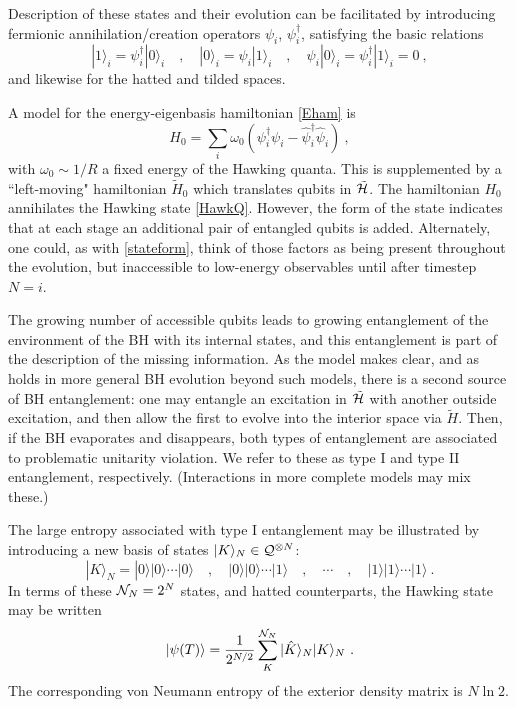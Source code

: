 \documentclass[12pt]{article}
\numberwithin{equation}{section}
\newcommand{\calh}{{\cal H}}
\newcommand{\caln}{{\cal N}}
\newcommand{\calq}{{\cal Q}}
\newcommand{\beq}{\begin{equation}}
\newcommand{\eeq}{\end{equation}}
\begin{document}
Description of these states  and their evolution can be facilitated by introducing fermionic annihilation/creation operators $\psi_i$, $\psi_i^\dagger$, satisfying the basic relations
\beq
|1\rangle_i = \psi_i^\dagger |0\rangle_i\quad ,\quad |0\rangle_i = \psi_i |1\rangle_i\quad,\quad \psi_i |0\rangle_i= \psi_i^\dagger |1\rangle_i =0\ ,
\eeq
and likewise for the hatted and tilded spaces.  

A model for the energy-eigenbasis hamiltonian \eqref{Eham} is 
\beq\label{Hzero}
H_0=\sum_i \omega_0 \left(\psi_i^\dagger \psi_i - \hat \psi_i^\dagger \hat \psi_i\right)\ ,
\eeq
with $\omega_0\sim 1/R$ a fixed energy of the Hawking quanta.  This is supplemented by a ``left-moving" hamiltonian $\tilde H_0$ which translates qubits in $\tilde \calh$.  The hamiltonian $H_0$ annihilates the Hawking state \eqref{HawkQ}.  However, the form of the state indicates that at each stage an additional pair of entangled qubits is added.  Alternately, one could, as with \eqref{stateform}, think of those factors as being present throughout the evolution, but inaccessible to low-energy observables until after timestep $N=i$.  

The growing number of accessible qubits leads to growing entanglement of the environment of the BH with its internal states, and this entanglement is part of the description of the missing information.  As the model makes clear, and as holds in more general BH evolution beyond such models, there is a second source of BH entanglement: one may entangle an excitation in $\tilde \calh$ with another outside excitation, and then allow the first to evolve into the interior space via $\tilde H$.  Then, if the BH evaporates and disappears, both types of entanglement are associated to problematic unitarity violation.  We refer to these as type I and type II entanglement, respectively.  (Interactions in more complete models may mix these.)

The large entropy associated with type I entanglement may be illustrated by introducing a new basis of states $|K\rangle_N\in \calq^{\otimes N}$:
\beq
|K\rangle_N =  |0\rangle |0\rangle\cdots  |0\rangle\quad,\quad |0\rangle |0\rangle\cdots  |1\rangle\quad ,\quad\cdots\quad,  \quad |1\rangle |1\rangle\cdots   |1\rangle\ .
\eeq
In terms of these $\caln_N=2^N$ states, and hatted counterparts, the Hawking state may be written 
\beq\label{Hawkexp}
|\psi(T)\rangle = \frac{1}{2^{N/2}}  \sum_{K}^{\caln_N}|\hat K\rangle_N  |K\rangle_N \ .
\eeq
The corresponding von Neumann entropy of the exterior density matrix is $N\ln 2$.
\end{document}
